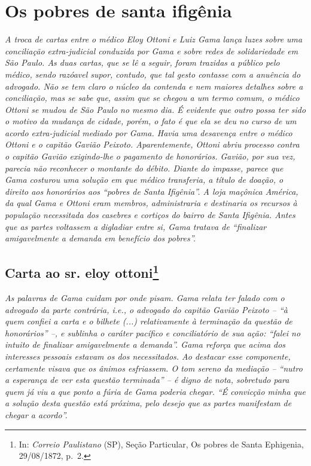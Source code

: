 \part{Os pobres de santa ifigênia}

\begin{didascalia}
\emph{A troca de cartas entre o médico Eloy Ottoni e Luiz Gama lança
luzes sobre uma conciliação extra-judicial conduzida por Gama e sobre
redes de solidariedade em São Paulo. As duas cartas, que se lê a seguir,
foram trazidas a público pelo médico, sendo razóavel supor, contudo, que
tal gesto contasse com a anuência do advogado. Não se tem claro o núcleo
da contenda e nem maiores detalhes sobre a conciliação, mas se sabe que,
assim que se chegou a um termo comum, o médico Ottoni se mudou de São
Paulo no mesmo dia. É evidente que outro possa ter sido o motivo da
mudança de cidade, porém, o fato é que ela se deu no curso de um acordo
extra-judicial mediado por Gama. Havia uma desavença entre o médico
Ottoni e o capitão Gavião Peixoto. Aparentemente, Ottoni abriu processo
contra o capitão Gavião exigindo-lhe o pagamento de honorários. Gavião,
por sua vez, parecia não reconhecer o montante do débito. Diante do
impasse, parece que Gama costurou uma solução em que médico transferia,
a título de doação, o direito aos honorários aos ``pobres de Santa
Ifigênia''. A loja maçônica América, da qual Gama e Ottoni eram membros,
administraria e destinaria os recursos à população necessitada dos
casebres e cortiços do bairro de Santa Ifigênia. Antes que as partes
voltassem a digladiar entre si, Gama tratava de ``finalizar amigavelmente
a demanda em benefício dos pobres''.}
\end{didascalia}

\chapter{Carta ao sr. eloy ottoni\footnote{ In: \emph{Correio Paulistano} (SP), Seção Particular, Os
  pobres de Santa Ephigenia, 29/08/1872, p.~2.}} %

\begin{didascalia}
\emph{As palavras de Gama cuidam por onde pisam. Gama relata ter falado
com o advogado da parte contrária, i.e., o advogado do capitão Gavião
Peixoto -- ``à quem confiei a carta e o bilhete (...) relativamente à
terminação da questão de honorários'' --, e sublinha o caráter pacífico e
conciliatório de sua ação: ``falei no intuito de finalizar amigavelmente
a demanda''. Gama reforça que acima dos interesses pessoais estavam os
dos necessitados. Ao destacar esse componente, certamente visava que os
ânimos esfriassem. O tom sereno da mediação -- ``nutro a esperança de ver
esta questão terminada'' -- é digno de nota, sobretudo para quem já viu a
que ponto a fúria de Gama poderia chegar. ``É convicção minha que a
solução desta questão está próxima, pelo desejo que as partes manifestam
de chegar a acordo''.}
\end{didascalia}

